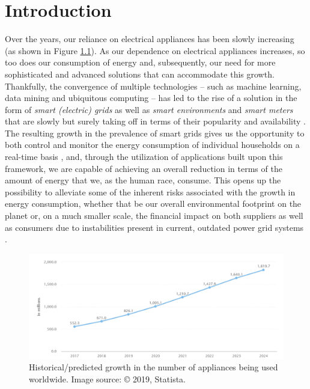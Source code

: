 \chapter{Introduction}
\label{ch:Introduction}
Over the years, our reliance on electrical appliances has been slowly increasing (as shown in Figure \ref{fig:Appliance-Usage-Growth}). As our dependence on electrical appliances increases, so too does our consumption of energy \cite{WBCSD, Yixuan} and, subsequently, our need for more sophisticated and advanced solutions that can accommodate this growth. Thankfully, the convergence of multiple technologies -- such as machine learning, data mining and ubiquitous computing -- has led to the rise of a solution in the form of \textit{smart (electric) grids} as well as \textit{smart environments} and \textit{smart meters} that are slowly but surely taking off in terms of their popularity and availability \cite{Chao}. The resulting growth in the prevalence of smart grids gives us the opportunity to both control and monitor the energy consumption of individual households on a real-time basis \cite{Yildiz}, and, through the utilization of applications built upon this framework, we are capable of achieving an overall reduction in terms of the amount of energy that we, as the human race, consume. This opens up the possibility to alleviate some of the inherent risks associated with the growth in energy consumption, whether that be our overall environmental footprint on the planet or, on a much smaller scale, the financial impact on both suppliers as well as consumers due to instabilities present in current, outdated power grid systems \cite{Hsiao}.

\begin{figure}[hbt!]
    \centering
    \includegraphics[width=\textwidth]{Images/Chapter 1/Statista/Appliance-Usage-Growth.pdf}
    \caption{Historical/predicted growth in the number of appliances being used worldwide. Image source: \cite{Statista} © 2019, Statista.}
    \label{fig:Appliance-Usage-Growth}
\end{figure}

